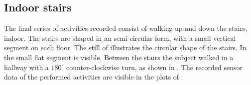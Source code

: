 \subsection{Indoor stairs}\label{subsec:indoor_stairs}
The final series of activities recorded consist of walking up and down the stairs, indoor.
The stairs are shaped in an semi-circular form, with a small vertical segment on each floor.
The still of  illustrates the circular shape of the stairs.
In  the small flat segment is visible.
Between the stairs the subject walked in a hallway with a $180^{\circ}$ counter-clockwise turn, as shown in .
The recorded sensor data of the performed activities are visible in the plots of .

